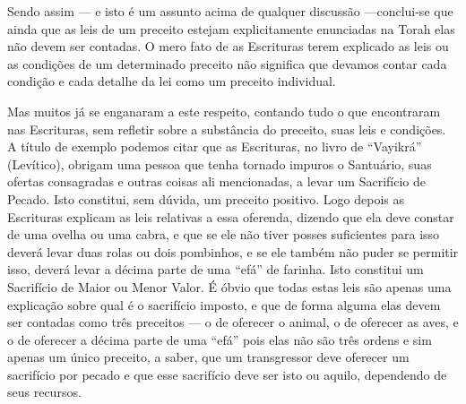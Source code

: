 Sendo assim --- e isto é um assunto acima de qualquer discussão
---conclui-se que ainda que as leis de um preceito estejam
explicitamente enunciadas na Torah elas não devem ser contadas. O mero
fato de as Escrituras terem explicado as leis ou as condições de um
determinado preceito não significa que devamos contar cada condição e
cada detalhe da lei como um preceito individual.

Mas muitos já se enganaram a este respeito, contando tudo o que
encontraram nas Escrituras, sem refletir sobre a substância do preceito,
suas leis e condições. A título de exemplo podemos citar que as
Escrituras, no livro de ``Vayikrá'' (Levítico), obrigam uma pessoa que
tenha tornado impuros o Santuário, suas ofertas consagradas e outras
coisas ali mencionadas, a levar um Sacrifício de Pecado. Isto
constitui, sem dúvida, um preceito positivo. Logo depois as Escrituras
explicam as leis relativas a essa oferenda, dizendo que ela deve
constar de uma ovelha ou uma cabra, e que se ele não tiver posses
suficientes para isso deverá levar duas rolas ou dois pombinhos, e se
ele também não puder se permitir isso, deverá levar a décima parte de
uma ``efá'' de farinha. Isto constitui um Sacrifício de Maior ou Menor
Valor. É óbvio que todas estas leis são apenas uma explicação sobre qual
é o sacrifício imposto, e que de forma alguma elas devem ser contadas
como três preceitos --- o de oferecer o animal, o de oferecer as aves,
e o de oferecer a décima parte de uma ``efá'' pois elas não são três
ordens e sim apenas um único preceito, a saber, que um transgressor deve
oferecer um sacrifício por pecado e que esse sacrifício deve ser isto ou
aquilo, dependendo de seus recursos.

